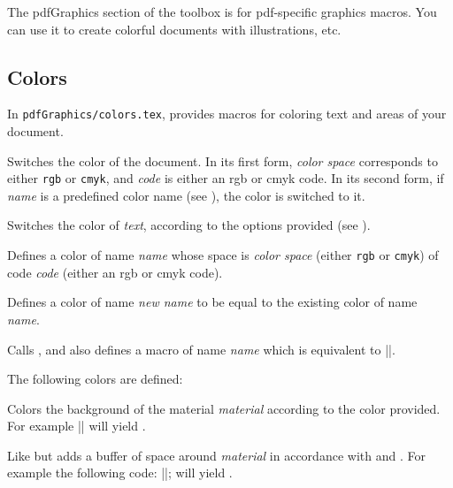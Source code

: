 The pdfGraphics section of the \pdftoolbox{} toolbox is for pdf-specific graphics macros.
You can use it to create colorful documents with illustrations, etc.

\subsection{Colors}

In {\tt pdfGraphics/colors.tex}, \pdftoolbox{} provides macros for coloring text and areas of your document.

Switches the color of the document.
In its first form, {\it color space} corresponds to either {\tt rgb} or {\tt cmyk}, and {\it code} is either an rgb or cmyk code.
In its second form, if {\it name} is a predefined color name (see \gotomacro\definecolor), the color is switched to it.
\emacroexp

Switches the color of {\it text}, according to the options provided (see \gotomacro\color).
\emacroexp

Defines a color of name {\it name} whose space is {\it color space} (either {\tt rgb} or {\tt cmyk}) of code {\it code} (either an rgb or cmyk code).
\emacroexp

Defines a color of name {\it new name} to be equal to the existing color of name {\it name}.
\emacroexp

Calls \gotomacro\definecolor, and also defines a macro of name {\it name} which is equivalent to \inlinecode||.

The following colors are defined:

\centerline{         }
\emacroexp

Colors the background of the material {\it material} according to the color provided.
For example \inlinecode|| will yield .
\emacroexp

Like \gotomacro\highlightbox{} but adds a buffer of space around {\it material} in accordance with \macro\bufferwidth\anchormacro\bufferwidth{} and \macro\bufferheight\anchormacro\bufferheight.
For example the following code: \inlinecode||; will yield .
\emacroexp

